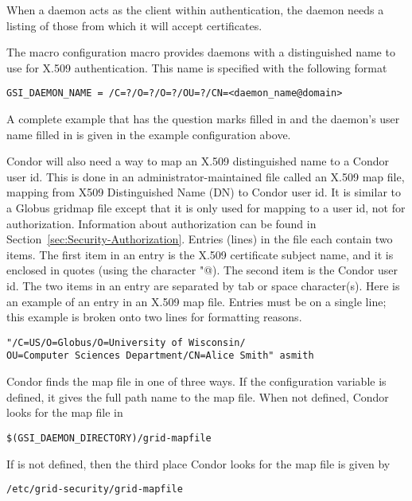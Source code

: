 \begin{description}
When a daemon acts as the client within authentication,
the daemon needs a listing of those from which it
will accept certificates.

The macro  configuration macro
provides daemons with a distinguished name to use for
X.509 authentication.
This name is specified with the following format
\footnotesize
\begin{verbatim}
GSI_DAEMON_NAME = /C=?/O=?/O=?/OU=?/CN=<daemon_name@domain>
\end{verbatim}
\normalsize
A complete example that has the question marks filled in and the
daemon's user name filled in is given in the 
example configuration above.

Condor will also need a way to map an X.509 distinguished
name to a Condor user id.
This is done in an administrator-maintained file called an X.509 map file,
mapping from X509 Distinguished Name (DN) to Condor user id.
It is similar to a Globus gridmap file except that it is only used for
mapping to a user id, not for authorization. 
Information about authorization can be found in
Section~\ref{sec:Security-Authorization}. 
Entries (lines) in the file each contain two items.
The first item in an entry is the 
X.509 certificate subject name, and it is enclosed in quotes
(using the character \verb@"@).
The second item is the Condor user id.
The two items in an entry are separated by tab or space character(s).
Here is an example of an entry in an X.509 map file.
Entries must be on a single line; this example is broken
onto two lines for formatting reasons.

\footnotesize
\begin{verbatim}
"/C=US/O=Globus/O=University of Wisconsin/
OU=Computer Sciences Department/CN=Alice Smith" asmith
\end{verbatim}
\normalsize

Condor finds the map file in one of three ways.
If the configuration variable  is defined,
it gives the full path name to the map file.
When not defined,
Condor looks for the map file in 
\begin{verbatim}
$(GSI_DAEMON_DIRECTORY)/grid-mapfile
\end{verbatim}
If  is not defined,
then the third place Condor looks for the map file is given by
\begin{verbatim}
/etc/grid-security/grid-mapfile
\end{verbatim}

\end{description}

